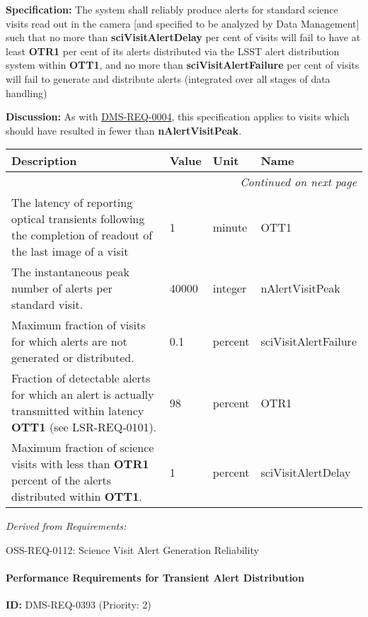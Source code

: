\documentclass[SE,toc,lsstdraft]{lsstdoc}
\makeatletter
\newcommand{\paramname}[1]{\hspace{0pt}#1}
\newcommand{\unitname}[1]{\hspace{0pt}#1}
\newenvironment{parameters}[0]{%
\setlength\LTleft{0pt}
\setlength\LTright{\fill}
\begin{small}
\begin{longtable}[]{|p{0.49\textwidth}|l|p{0.6in}|p{1.70in}@{}|}

\hline \textbf{Description} & \textbf{Value} & \textbf{Unit} & \textbf{Name} \\ \hline
\endhead

\hline \multicolumn{4}{r}{\emph{Continued on next page}} \\
\endfoot

\hline\hline
\endlastfoot
}{%
\hline
\end{longtable}
\end{small}
}
\makeatother
\begin{document}
\textbf{Specification:}
The system shall reliably produce alerts for standard science visits read out in the camera [and specified to be analyzed by Data Management] such that no more than \textbf{sciVisitAlertDelay} per cent of visits will fail to have at least \textbf{OTR1} per cent of its alerts distributed via the LSST alert distribution system within \textbf{OTT1}, and no more than \textbf{sciVisitAlertFailure} per cent of visits will fail to generate and distribute alerts (integrated over all stages of data handling)

\textbf{Discussion:}
As with \hyperref[DMS-REQ-0004]{DMS-REQ-0004}, this specification applies to visits which should have resulted in fewer than \textbf{nAlertVisitPeak}.

\begin{parameters}
The latency of reporting optical transients following the completion of readout of the last image of a visit
&
1
&
\unitname{%
minute
}
&
\paramname{%
OTT1
} \\\hline
The instantaneous peak number of alerts per standard visit.
&
40000
&
\unitname{%
integer
}
&
\paramname{%
nAlertVisitPeak
} \\\hline
Maximum fraction of visits for which alerts are not generated or distributed.
&
0.1
&
\unitname{%
percent
}
&
\paramname{%
sciVisitAlertFailure
} \\\hline
Fraction of detectable alerts for which an alert is actually transmitted within latency \textbf{OTT1} (see LSR-REQ-0101).
&
98
&
\unitname{%
percent
}
&
\paramname{%
OTR1
} \\\hline
Maximum fraction of science visits with less than \textbf{OTR1} percent of the alerts distributed within \textbf{OTT1}.
&
1
&
\unitname{%
percent
}
&
\paramname{%
sciVisitAlertDelay
} \\\hline
\end{parameters}

\emph{Derived from Requirements:}

OSS-REQ-0112:
Science Visit Alert Generation Reliability \newline

\paragraph{Performance Requirements for Transient Alert Distribution}\hfill  %

\label{DMS-REQ-0393}
\textbf{ID:} DMS-REQ-0393 (Priority: 2)
\end{document}
